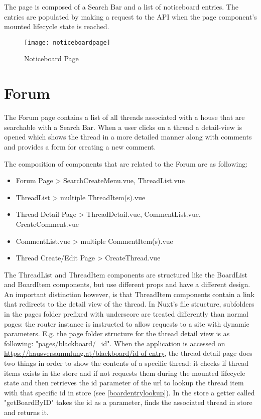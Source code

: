 The page is composed of a Search Bar and a list of noticeboard entries. The entries are populated by making a request to the API when the page component's mounted lifecycle state is reached.

\begin{figure}[H]
  \begin{center}
  \texttt{[image: noticeboardpage]}
  \end{center}
  \caption{Noticeboard Page}
  \label{fig:langswitcher}
\end{figure}

\section{Forum}
The Forum page contains a list of all threads associated with a house that are searchable with a Search Bar. When a user clicks on a thread a detail-view is opened which shows the thread in a more detailed manner along with comments and provides a form for creating a new comment.

The composition of components that are related to the Forum are as following:

\begin{itemize}
  \item Forum Page > SearchCreateMenu.vue, ThreadList.vue
  \item ThreadList > multiple ThreadItem(s).vue
  \item Thread Detail Page > ThreadDetail.vue, CommentList.vue, CreateComment.vue
  \item CommentList.vue > multiple CommentItem(s).vue
  \item Thread Create/Edit Page > CreateThread.vue
\end{itemize}

The ThreadList and ThreadItem components are structured like the BoardList and BoardItem components, but use different props and have a different design. An important distinction however, is that ThreadItem components contain a link that redirects to the detail view of the thread. In Nuxt's file structure, subfolders in the pages folder prefixed with underscore are treated differently than normal pages: the router instance is instructed to allow requests to a site with dynamic parameters. E.g. the page folder structure for the thread detail view is as following: "pages/blackboard/\_id". When the application is accessed on \url{https://hausversammlung.at/blackboard/id-of-entry}, the thread detail page does two things in order to show the contents of a specific thread: it checks if thread items exists in the store and if not requests them during the mounted lifecycle state and then retrieves the id parameter of the url to lookup the thread item with that specific id in store (see \autoref{boardentrylookup}). In the store a getter called "getBoardByID" takes the id as a parameter, finds the associated thread in store and returns it. \newline

